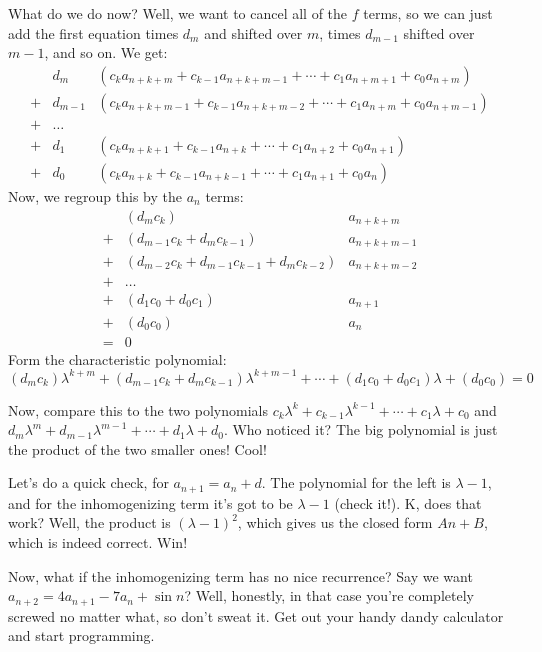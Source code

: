 \documentclass[12pt,letterpaper]{article}
\begin{document}
What do we do now? Well, we want to cancel all of the $f$ terms, so we can just
add the first equation times $d_m$ and shifted over $m$, times $d_{m-1}$ shifted
over $m-1$, and so on. We get:
\begin{align}
&d_m &(c_k a_{n+k+m} + c_{k-1} a_{n+k+m-1} + \cdots + c_1 a_{n+m+1} + c_0 a_{n+m}) \\
+&d_{m-1} &(c_k a_{n+k+m-1} + c_{k-1} a_{n+k+m-2} + \cdots + c_1 a_{n+m} + c_0 a_{n+m-1}) \\
+&\dots& \\
+&d_{1} &(c_k a_{n+k+1} + c_{k-1} a_{n+k} + \cdots + c_1 a_{n+2} + c_0 a_{n+1}) \\
+&d_{0} &(c_k a_{n+k} + c_{k-1} a_{n+k-1} + \cdots + c_1 a_{n+1} + c_0 a_{n})
\end{align}
Now, we regroup this by the $a_n$ terms:
\begin{align*}
&(d_m c_k)&a_{n+k+m} \\
+&(d_{m-1} c_k + d_m c_{k-1})&a_{n+k+m-1} \\
+&(d_{m-2} c_k + d_{m-1} c_{k-1} + d_m c_{k-2})&a_{n+k+m-2} \\
+&\dots&\\
+&(d_1 c_0 + d_0 c_1)&a_{n+1} \\
+&(d_0 c_0)&a_n \\
=&0&
\end{align*}
Form the characteristic polynomial:
$$(d_m c_k) \lambda^{k+m} + (d_{m-1} c_k + d_m c_{k-1}) \lambda^{k+m-1} + \cdots
+ (d_1 c_0 + d_0 c_1) \lambda + (d_0 c_0) = 0$$

Now, compare this to the two polynomials $c_k \lambda^k + c_{k-1} \lambda^{k-1}
+ \cdots + c_1 \lambda + c_0$ and $d_m \lambda^m + d_{m-1} \lambda^{m-1}
+ \cdots + d_1 \lambda + d_0$. Who noticed it? The big polynomial is just the
product of the two smaller ones! Cool!

Let's do a quick check, for $a_{n+1} = a_n + d$. The polynomial for the left
is $\lambda - 1$, and for the inhomogenizing term it's got to be $\lambda - 1$
(check it!). K, does that work? Well, the product is $(\lambda - 1)^2$, which
gives us the closed form $An + B$, which is indeed correct. Win!

Now, what if the inhomogenizing term has no nice recurrence? Say we want
$a_{n+2} = 4a_{n+1} - 7a_n + \sin n$? Well, honestly, in that case you're
completely screwed no matter what, so don't sweat it. Get out your handy dandy
calculator and start programming.
\end{document}
